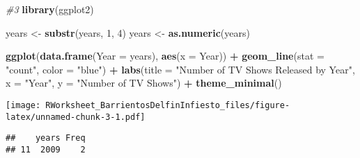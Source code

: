 \documentclass[
]{article}
\newenvironment{Shaded}{\begin{snugshade}}{\end{snugshade}}
\newcommand{\AttributeTok}[1]{\textcolor[rgb]{0.13,0.29,0.53}{#1}}
\newcommand{\CommentTok}[1]{\textcolor[rgb]{0.56,0.35,0.01}{\textit{#1}}}
\newcommand{\DecValTok}[1]{\textcolor[rgb]{0.00,0.00,0.81}{#1}}
\newcommand{\FunctionTok}[1]{\textcolor[rgb]{0.13,0.29,0.53}{\textbf{#1}}}
\newcommand{\NormalTok}[1]{#1}
\newcommand{\OtherTok}[1]{\textcolor[rgb]{0.56,0.35,0.01}{#1}}
\newcommand{\SpecialCharTok}[1]{\textcolor[rgb]{0.81,0.36,0.00}{\textbf{#1}}}
\newcommand{\StringTok}[1]{\textcolor[rgb]{0.31,0.60,0.02}{#1}}
\begin{document}
\begin{Shaded}
\begin{Highlighting}[]
\CommentTok{\#3  }
\FunctionTok{library}\NormalTok{(ggplot2)}

\NormalTok{years }\OtherTok{\textless{}{-}} \FunctionTok{substr}\NormalTok{(years, }\DecValTok{1}\NormalTok{, }\DecValTok{4}\NormalTok{)}
\NormalTok{years }\OtherTok{\textless{}{-}} \FunctionTok{as.numeric}\NormalTok{(years) }

\FunctionTok{ggplot}\NormalTok{(}\FunctionTok{data.frame}\NormalTok{(}\AttributeTok{Year =}\NormalTok{ years), }\FunctionTok{aes}\NormalTok{(}\AttributeTok{x =}\NormalTok{ Year)) }\SpecialCharTok{+}
  \FunctionTok{geom\_line}\NormalTok{(}\AttributeTok{stat =} \StringTok{"count"}\NormalTok{, }\AttributeTok{color =} \StringTok{"blue"}\NormalTok{) }\SpecialCharTok{+}
  \FunctionTok{labs}\NormalTok{(}\AttributeTok{title =} \StringTok{"Number of TV Shows Released by Year"}\NormalTok{,}
       \AttributeTok{x =} \StringTok{"Year"}\NormalTok{,}
       \AttributeTok{y =} \StringTok{"Number of TV Shows"}\NormalTok{) }\SpecialCharTok{+}
  \FunctionTok{theme\_minimal}\NormalTok{()}
\end{Highlighting}
\end{Shaded}

\texttt{[image: RWorksheet\_BarrientosDelfinInfiesto\_files/figure-latex/unnamed-chunk-3-1.pdf]}

\begin{Shaded}
\end{Shaded}

\begin{verbatim}
##    years Freq
## 11  2009    2
\end{verbatim}
\end{document}
